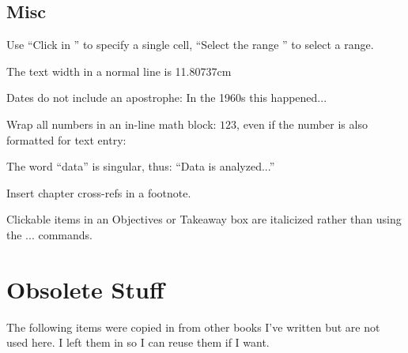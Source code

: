 \begin{enumerate}[resume]
\subsection{Misc}
Use ``Click in '' to specify a single cell, ``Select the range '' to select a range.

The text width in a normal line is 11.80737cm

Dates do not include an apostrophe: In the 1960s this happened...

Wrap all numbers in an in-line math block: $ 123 $, even if the number is also formatted for text entry: 

The word ``data'' is singular, thus: ``Data is analyzed...''

Insert chapter cross-refs in a footnote.

Clickable items in an Objectives or Takeaway box are italicized rather than using the \fmt... commands.


\section{Obsolete Stuff}
The following items were copied in from other books I've written but are not used here. I left them in so I can reuse them if I want.





\end{enumerate}
